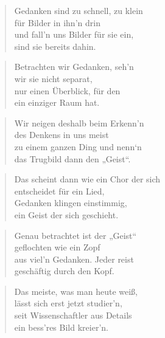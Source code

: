 \documentclass[10pt,a4paper]{article}
\begin{document}
\begin{paracol}{2}
\begin{verse}
Gedanken sind zu schnell, zu klein \\
für Bilder in ihn’n drin \\
und fall’n uns Bilder für sie ein, \\
sind sie bereits dahin. \\
\end{verse}

\begin{verse}
Betrachten wir Gedanken, seh’n \\
wir sie nicht separat, \\
nur einen Überblick, für den \\
ein einziger Raum hat. \\
\end{verse}

\begin{verse}
Wir neigen deshalb beim Erkenn’n \\
des Denkens in uns meist \\
zu einem ganzen Ding und nenn‘n \\
das Trugbild dann den „Geist“. \\
\end{verse}

\begin{verse}
Das scheint dann wie ein Chor der sich \\
entscheidet für ein Lied, \\
Gedanken klingen einstimmig, \\
ein Geist der sich geschieht. \\
\end{verse}

\begin{verse}
Genau betrachtet ist der „Geist“ \\
geflochten wie ein Zopf \\
aus viel’n Gedanken. Jeder reist \\
geschäftig durch den Kopf. \\
\end{verse}

\begin{verse}
Das meiste, was man heute weiß, \\
lässt sich erst jetzt studier’n, \\
seit Wissenschaftler aus Details \\
ein bess’res Bild kreier’n. \\
\end{verse}


\end{paracol}
\end{document}
